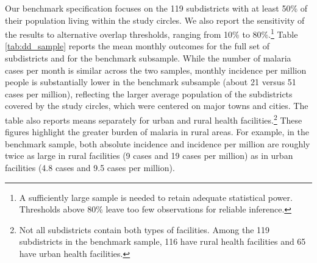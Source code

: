 Our benchmark specification focuses on the 119 subdistricts with at least 50\% of their population living within the study circles. We also report the sensitivity of the results to alternative overlap thresholds, ranging from 10\% to 80\%.\footnote{A sufficiently large sample is needed to retain adequate statistical power. Thresholds above 80\% leave too few observations for reliable inference.} Table \ref{tab:dd_sample} reports the mean monthly outcomes for the full set of subdistricts and for the benchmark subsample. While the number of malaria cases per month is similar across the two samples, monthly incidence per million people is substantially lower in the benchmark subsample (about 21 versus 51 cases per million), reflecting the larger average population of the subdistricts covered by the study circles, which were centered on major towns and cities. The table also reports means separately for urban and rural health facilities.\footnote{Not all subdistricts contain both types of facilities. Among the 119 subdistricts in the benchmark sample, 116 have rural health facilities and 65 have urban health facilities.} These figures highlight the greater burden of malaria in rural areas. For example, in the benchmark sample, both absolute incidence and incidence per million are roughly twice as large in rural facilities (9 cases and 19 cases per million) as in urban facilities (4.8 cases and 9.5 cases per million). %

\begin{table}[!htbp]
    \centering
    \caption{Administrative health-facility data: mean monthly outcomes across subdistricts}
    \footnotesize
    \hspace*{-1.5cm}
    
    \label{tab:dd_sample}
\end{table}

